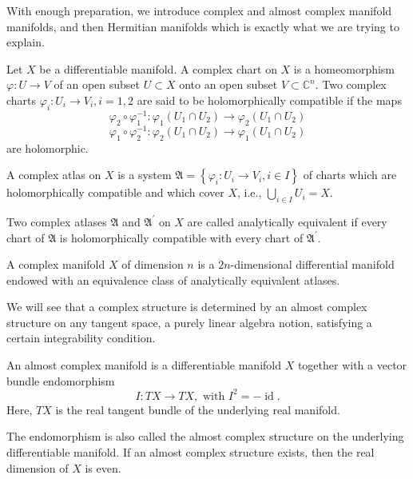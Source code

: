\documentclass{ctexart}
\begin{document}
With enough preparation, we introduce complex and almost complex manifold manifolds, and then Hermitian manifolds which is exactly what we are trying to explain.
\begin{definition}
    Let $X$ be a differentiable manifold. A complex chart on $X$ is a homeomorphism $\varphi: U \rightarrow V$ of an open subset $U \subset X$ onto an open subset $V \subset \mathbb{C}^n$. 
    Two complex charts $\varphi_{i}: U_{i} \rightarrow V_{i}, i=1,2$ are said to be holomorphically compatible if the maps
    $$
    \varphi_{2} \circ \varphi_{1}^{-1}: \varphi_{1}\left(U_{1} \cap U_{2}\right) \rightarrow \varphi_{2}\left(U_{1} \cap U_{2}\right)
    $$
    $$
    \varphi_{1} \circ \varphi_{2}^{-1}: \varphi_{2}\left(U_{1} \cap U_{2}\right) \rightarrow \varphi_{1}\left(U_{1} \cap U_{2}\right)
    $$
    are holomorphic.
\end{definition}
A complex atlas on $X$ is a system $\mathfrak{A}=\left\{\varphi_{i}: U_{i} \rightarrow V_{i}, i \in I\right\}$ of charts which are holomorphically compatible and which cover $X$, i.e., 
$\bigcup_{i \in I} U_{i}=X$.

Two complex atlases $\mathfrak{A}$ and $\mathfrak{A}^\prime$ on $X$ are called analytically equivalent if every chart of $\mathfrak{A}$ is holomorphically compatible with 
every chart of $\mathfrak{A}^{\prime}$.

\begin{definition}
    A complex manifold $X$ of dimension $n$ is a $2n$-dimensional differential manifold endowed with an equivalence class of analytically equivalent atlases. 
\end{definition}

We will see that a complex structure is determined by an almost complex structure on any tangent space, 
a purely linear algebra notion, satisfying a certain integrability condition.

\begin{definition}
  An almost complex manifold is a differentiable manifold $X$ together with a vector bundle endomorphism
  $$
  I: TX\rightarrow TX, \text{ with }I^2 = -\operatorname{id}. 
  $$
  Here, $T X$ is the real tangent bundle of the underlying real manifold.
\end{definition}

The endomorphism is also called the almost complex structure on the underlying differentiable manifold. If an almost complex structure exists, 
then the real dimension of $X$ is even. 
\end{document}

